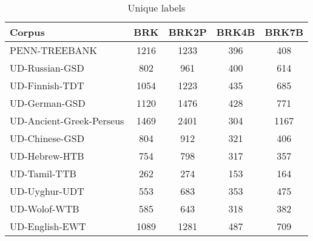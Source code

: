         \begin{table}[h]
            \centering
            \caption{Unique labels}
            \label{tab:unique}
            \begin{tabular}{lcccc}
                \hline
                Corpus                          &  BRK & BRK2P & BRK4B & BRK7B \\
                \hline
                PENN-TREEBANK                   & 1216 &  1233 &   396 &   408 \\
                UD-Russian-GSD                  &  802 &   961 &   400 &   614 \\
                UD-Finnish-TDT                  & 1054 &  1223 &   435 &   685 \\
                UD-German-GSD                   & 1120 &  1476 &   428 &   771 \\
                UD-Ancient-Greek-Perseus        & 1469 &  2401 &   304 &  1167 \\
                UD-Chinese-GSD                  &  804 &   912 &   321 &   406 \\
                UD-Hebrew-HTB                   &  754 &   798 &   317 &   357 \\
                UD-Tamil-TTB                    &  262 &   274 &   153 &   164 \\
                UD-Uyghur-UDT                   &  553 &   683 &   353 &   475 \\
                UD-Wolof-WTB                    &  585 &   643 &   318 &   382 \\
                UD-English-EWT                  & 1089 &  1281 &   487 &   709 \\
                \hline
            \end{tabular}
        \end{table}



